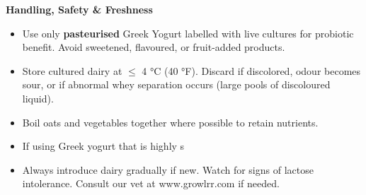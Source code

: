 \vspace{0.5mm}

\begin{flushleft}
\textbf{Handling, Safety \& Freshness}\\[2pt]
\begin{itemize}[noitemsep]
  \item Use only \textbf{pasteurised} Greek Yogurt labelled with live cultures for probiotic benefit. Avoid sweetened, flavoured, or fruit-added products.
  \item Store cultured dairy at $\leq$ 4 °C (40 °F). Discard if discolored, odour becomes sour, or if abnormal whey separation occurs (large pools of discoloured liquid).
  \item Boil oats and vegetables together where possible to retain nutrients.
  \item If using Greek yogurt that is highly s
  \item Always introduce dairy gradually if new. Watch for signs of lactose intolerance. Consult our vet at www.growlrr.com if needed.
\end{itemize}
\end{flushleft}








